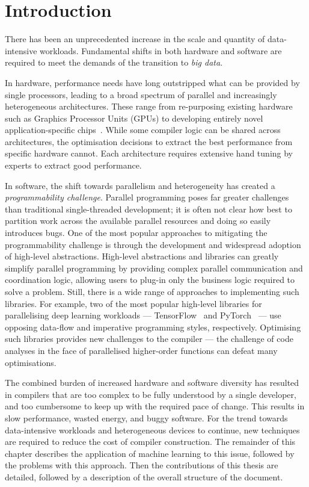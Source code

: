 \chapter{Introduction}

There has been an unprecedented increase in the scale and quantity of data-intensive workloads. Fundamental shifts in both hardware and software are required to meet the demands of the transition to \emph{big data}.

In hardware, performance needs have long outstripped what can be provided by single processors, leading to a broad spectrum of parallel and increasingly heterogeneous architectures. These range from re-purposing existing hardware such as Graphics Processor Units (GPUs) to developing entirely novel application-specific chips~\cite{Misra2010,Jouppi2017}. While some compiler logic can be shared across architectures, the optimisation decisions to extract the best performance from specific hardware cannot. Each architecture requires extensive hand tuning by experts to extract good performance.

In software, the shift towards parallelism and heterogeneity has created a \emph{programmability challenge}. Parallel programming poses far greater challenges than traditional single-threaded development; it is often not clear how best to partition work across the available parallel resources and doing so easily introduces bugs. One of the most popular approaches to mitigating the programmability challenge is through the development and widespread adoption of high-level abstractions. High-level abstractions and libraries can greatly simplify parallel programming by providing complex parallel communication and coordination logic, allowing users to plug-in only the business logic required to solve a problem. Still, there is a wide range of approaches to implementing such libraries. For example, two of the most popular high-level libraries for parallelising deep learning workloads --- TensorFlow~\cite{Abadi} and PyTorch~\cite{Paszke2017} --- use opposing data-flow and imperative programming styles, respectively. Optimising such libraries provides new challenges to the compiler --- the challenge of code analyses in the face of parallelised higher-order functions can defeat many optimisations.

The combined burden of increased hardware and software diversity has resulted in compilers that are too complex to be fully understood by a single developer, and too cumbersome to keep up with the required pace of change. This results in slow performance, wasted energy, and buggy software. For the trend towards data-intensive workloads and heterogeneous devices to continue, new techniques are required to reduce the cost of compiler construction. The remainder of this chapter describes the application of machine learning to this issue, followed by the problems with this approach. Then the contributions of this thesis are detailed, followed by a description of the overall structure of the document.


